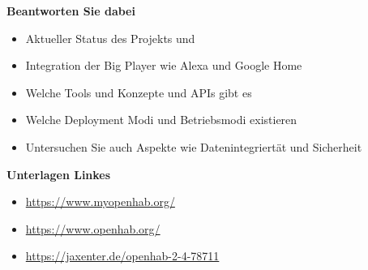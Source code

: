 \textbf{Beantworten Sie dabei}
\begin{itemize}
 \item Aktueller Status des Projekts und  
 \item Integration der Big Player wie Alexa und Google Home
 \item Welche Tools und Konzepte und APIs gibt es
 \item Welche Deployment Modi und Betriebsmodi existieren
 \item Untersuchen Sie auch Aspekte wie Datenintegriertät und Sicherheit
\end{itemize}

\textbf{Unterlagen Linkes}
\begin{itemize}
	\item \url{https://www.myopenhab.org/}
	\item \url{https://www.openhab.org/}
	\item \url{https://jaxenter.de/openhab-2-4-78711}
\end{itemize}

